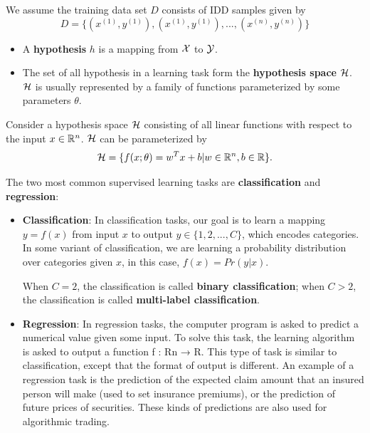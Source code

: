 \begin{refsection}
We assume the training data set $D$ consists of IDD samples given by
$$D = \{(x^{(1)}, y^{(1)}), (x^{(1)}, y^{(1)}), ..., (x^{(n)}, y^{(n)})\}$$

\begin{definition}\hfill
	\begin{itemize}
		\item A \textbf{hypothesis} $h$ is a mapping from $\mathcal{X}$ to $\mathcal{Y}$.
		\item The set of all hypothesis in a learning task form the \textbf{hypothesis space} $\mathcal{H}$. $\mathcal{H}$ is usually represented by a family of functions parameterized by some parameters $\theta$.
	\end{itemize}	
	
\end{definition}



\begin{example}
	Consider a hypothesis space $\mathcal{H}$ consisting of all linear functions with respect to the input $x\in \mathbb{R}^n$. $\mathcal{H}$ can be parameterized by
	$$\mathcal{H} = \{f(x;\theta) = w^Tx + b| w\in \mathbb{R}^n, b\in \mathbb{R}\}.$$	
\end{example}




The two most common supervised learning tasks are \textbf{classification} and \textbf{regression}:
 
\begin{itemize}
	\item \textbf{Classification}: In classification tasks, our goal is to learn a mapping $y = f(x)$ from input $x$ to output $y \in \{1, 2, ..., C\}$, which encodes categories. In some variant of classification, we are learning a probability distribution over categories given $x$, in this case, $f(x) = Pr(y|x)$.
	
	When $C = 2$, the classification is called \textbf{binary classification}; when $C > 2$, the classification is called \textbf{multi-label classification}. 
	\item \textbf{Regression}: In regression tasks, the computer program is asked to predict a
	numerical value given some input. To solve this task, the learning algorithm
	is asked to output a function f : Rn → R. This type of task is similar to
	classification, except that the format of output is different. An example of
	a regression task is the prediction of the expected claim amount that an
	insured person will make (used to set insurance premiums), or the prediction
	of future prices of securities. These kinds of predictions are also used for
	algorithmic trading.
	

\end{itemize}
\end{refsection}
